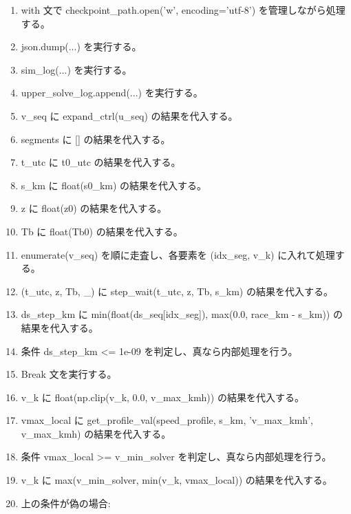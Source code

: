 \documentclass[a4paper,11pt]{article}
\begin{document}
\begin{enumerate}[leftmargin=1.8em]
\item with 文で checkpoint\_path.open('w', encoding='utf-8') を管理しながら処理する。
\item   json.dump(...) を実行する。
\item sim\_log(...) を実行する。
\item upper\_solve\_log.append(...) を実行する。
\item v\_seq に expand\_ctrl(u\_seq) の結果を代入する。
\item segments に [] の結果を代入する。
\item t\_utc に t0\_utc の結果を代入する。
\item s\_km に float(s0\_km) の結果を代入する。
\item z に float(z0) の結果を代入する。
\item Tb に float(Tb0) の結果を代入する。
\item enumerate(v\_seq) を順に走査し、各要素を (idx\_seg, v\_k) に入れて処理する。
\item   (t\_utc, z, Tb, \_) に step\_wait(t\_utc, z, Tb, s\_km) の結果を代入する。
\item   ds\_step\_km に min(float(ds\_seq[idx\_seg]), max(0.0, race\_km - s\_km)) の結果を代入する。
\item   条件 ds\_step\_km <= 1e-09 を判定し、真なら内部処理を行う。
\item     Break 文を実行する。
\item   v\_k に float(np.clip(v\_k, 0.0, v\_max\_kmh)) の結果を代入する。
\item   vmax\_local に get\_profile\_val(speed\_profile, s\_km, 'v\_max\_kmh', v\_max\_kmh) の結果を代入する。
\item   条件 vmax\_local >= v\_min\_solver を判定し、真なら内部処理を行う。
\item     v\_k に max(v\_min\_solver, min(v\_k, vmax\_local)) の結果を代入する。
\item     上の条件が偽の場合:
            \end{enumerate}
\end{document}
